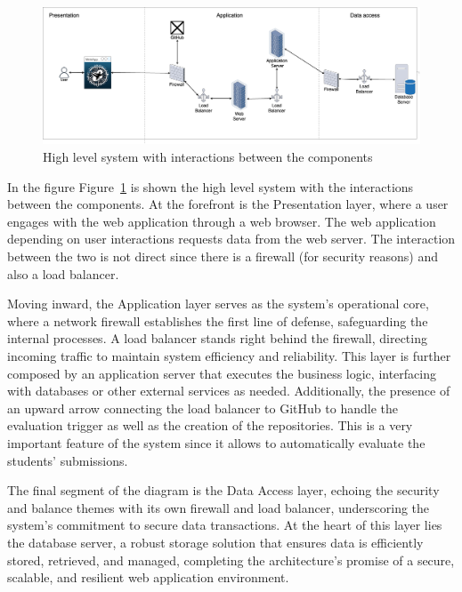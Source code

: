 \begin{figure}[H]
    \centering
    \includegraphics[width=\textwidth]{Images/high_level.png}
    \caption{High level system with interactions between the components}
    \label{fig:high_level_system}
\end{figure}

In the figure Figure\ \ref{fig:high_level_system} is shown the high level system with the interactions between the components. 
At the forefront is the Presentation layer, where a user engages with the web application through a web browser.
The web application depending on user interactions requests data from the web server. The interaction between the two is not direct since there is a firewall (for security reasons) and also a load balancer.

Moving inward, the Application layer serves as the system's operational core, where a network firewall establishes the first line of defense, safeguarding the internal processes. A load balancer stands right behind the firewall, directing incoming traffic to maintain system efficiency and reliability. This layer is further composed by an application server that executes the business logic, interfacing with databases or other external services as needed. Additionally, the presence of an upward arrow connecting the load balancer to GitHub to handle the evaluation trigger as well as the creation of the repositories. This is a very important feature of the system since it allows to automatically evaluate the students' submissions.

The final segment of the diagram is the Data Access layer, echoing the security and balance themes with its own firewall and load balancer, underscoring the system's commitment to secure data transactions. At the heart of this layer lies the database server, a robust storage solution that ensures data is efficiently stored, retrieved, and managed, completing the architecture's promise of a secure, scalable, and resilient web application environment.

